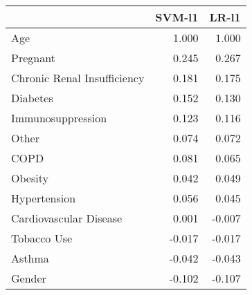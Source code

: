 \begin{tabular}{lrr}
\toprule
{} &  SVM-l1 &  LR-l1 \\
\midrule
Age                         &   1.000 &  1.000 \\
Pregnant                    &   0.245 &  0.267 \\
Chronic Renal Insufficiency &   0.181 &  0.175 \\
Diabetes                    &   0.152 &  0.130 \\
Immunosuppression           &   0.123 &  0.116 \\
Other                       &   0.074 &  0.072 \\
COPD                        &   0.081 &  0.065 \\
Obesity                     &   0.042 &  0.049 \\
Hypertension                &   0.056 &  0.045 \\
Cardiovascular Disease      &   0.001 & -0.007 \\
Tobacco Use                 &  -0.017 & -0.017 \\
Asthma                      &  -0.042 & -0.043 \\
Gender                      &  -0.102 & -0.107 \\
\bottomrule
\end{tabular}

